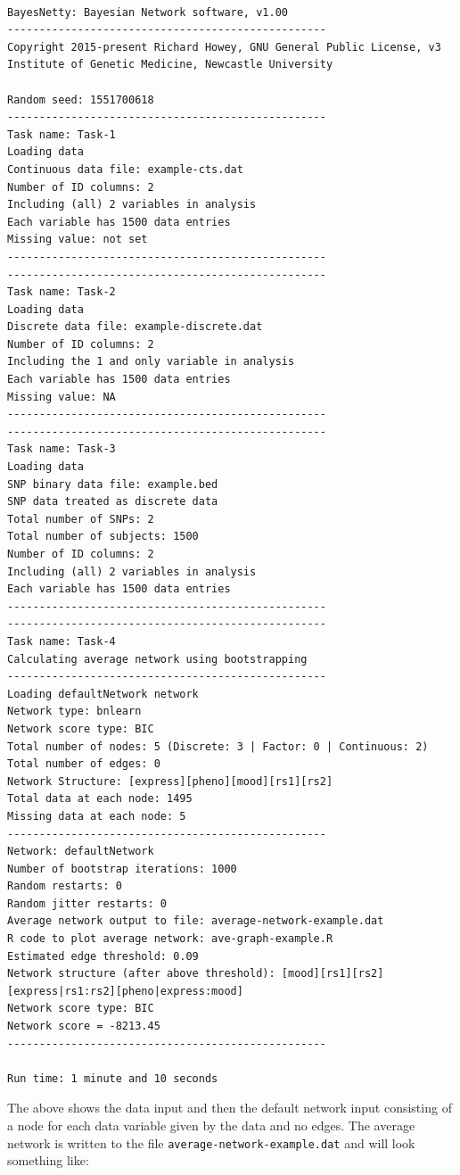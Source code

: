 \documentclass[a4paper,12pt]{article}
\newcommand{\code}[1]{{\footnotesize{{\tt #1}}}}
\begin{document}
\vspace{0.35cm} \begin{lstlisting}

BayesNetty: Bayesian Network software, v1.00
--------------------------------------------------
Copyright 2015-present Richard Howey, GNU General Public License, v3
Institute of Genetic Medicine, Newcastle University

Random seed: 1551700618
--------------------------------------------------
Task name: Task-1
Loading data
Continuous data file: example-cts.dat
Number of ID columns: 2
Including (all) 2 variables in analysis
Each variable has 1500 data entries
Missing value: not set
--------------------------------------------------
--------------------------------------------------
Task name: Task-2
Loading data
Discrete data file: example-discrete.dat
Number of ID columns: 2
Including the 1 and only variable in analysis
Each variable has 1500 data entries
Missing value: NA
--------------------------------------------------
--------------------------------------------------
Task name: Task-3
Loading data
SNP binary data file: example.bed
SNP data treated as discrete data
Total number of SNPs: 2
Total number of subjects: 1500
Number of ID columns: 2
Including (all) 2 variables in analysis
Each variable has 1500 data entries
--------------------------------------------------
--------------------------------------------------
Task name: Task-4
Calculating average network using bootstrapping
--------------------------------------------------
Loading defaultNetwork network
Network type: bnlearn
Network score type: BIC
Total number of nodes: 5 (Discrete: 3 | Factor: 0 | Continuous: 2)
Total number of edges: 0
Network Structure: [express][pheno][mood][rs1][rs2]
Total data at each node: 1495
Missing data at each node: 5
--------------------------------------------------
Network: defaultNetwork
Number of bootstrap iterations: 1000
Random restarts: 0
Random jitter restarts: 0
Average network output to file: average-network-example.dat
R code to plot average network: ave-graph-example.R
Estimated edge threshold: 0.09
Network structure (after above threshold): [mood][rs1][rs2][express|rs1:rs2][pheno|express:mood]
Network score type: BIC
Network score = -8213.45
--------------------------------------------------

Run time: 1 minute and 10 seconds

\end{lstlisting} \vspace{0.35cm}
The above shows the data input and then the default network input consisting of a node for each data variable given by the data and no edges. The average network is written to the file \code{average-network-example.dat} and will look something like: 
\end{document}
